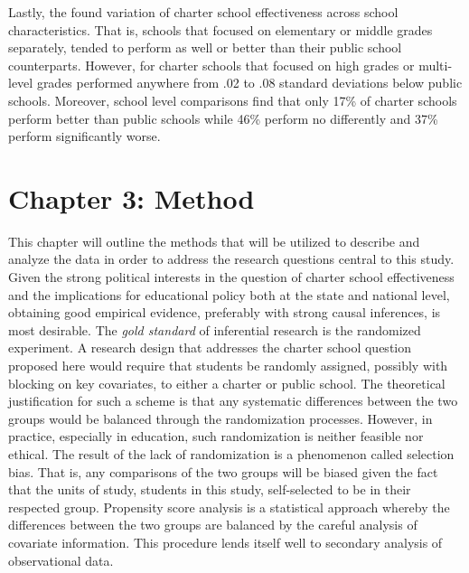 \documentclass[letterpaper,12p,twoside]{article} %
\begin{document}
Lastly, the  found variation of charter school effectiveness across school characteristics. That is, schools that focused on elementary or middle grades separately, tended to perform as well or better than their public school counterparts. However, for charter schools that focused on high grades or multi-level grades performed anywhere from .02 to .08 standard deviations below public schools. Moreover, school level comparisons find that only 17\% of charter schools perform better than public schools while 46\% perform no differently and 37\% perform significantly worse.





\cleardoublepage
\section{Chapter 3: Method}
This chapter will outline the methods that will be utilized to describe and analyze the data in order to address the research questions central to this study. Given the strong political interests in the question of charter school effectiveness and the implications for educational policy both at the state and national level, obtaining good empirical evidence, preferably with strong causal inferences, is most desirable. The \textit{gold standard} of inferential research is the randomized experiment. A research design that addresses the charter school question proposed here would require that students be randomly assigned, possibly with blocking on key covariates, to either a charter or public school. The theoretical justification for such a scheme is that any systematic differences between the two groups would be balanced through the randomization processes. However, in practice, especially in education, such randomization is neither feasible nor ethical. The result of the lack of randomization is a phenomenon called selection bias. That is, any comparisons of the two groups will be biased given the fact that the units of study, students in this study, self-selected to be in their respected group. Propensity score analysis \cite{rosenbaum83} is a statistical approach whereby the differences between the two groups are balanced by the careful analysis of covariate information. This procedure lends itself well to secondary analysis of observational data.
\end{document}
